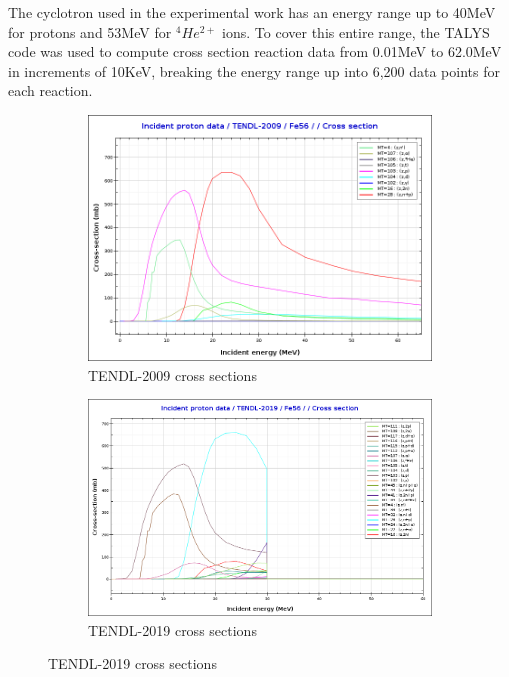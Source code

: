 The cyclotron used in the experimental work has an energy range up to 40MeV for protons and 53MeV for ${}^{4}He^{2+}$ ions.  To cover this entire range, the TALYS code was used to compute cross section reaction data from 0.01MeV to 62.0MeV in increments of 10KeV, breaking the energy range up into 6,200 data points for each reaction.

\begin{figure}[htb]
\centering
\begin{subfigure}{0.49\textwidth}
  \includegraphics[width=\linewidth]{chapters/activity_code/tendl-fe56/tendl_2009_p_fe56.png}
  \caption{TENDL-2009 cross sections}
  \label{fig:xsdata-tendl2009}
\end{subfigure}\hfil %
\begin{subfigure}{0.49\textwidth}
  \includegraphics[width=\linewidth]{chapters/activity_code/tendl-fe56/tendl_2019_p_fe56.png}
  \caption{TENDL-2019 cross sections}
  \label{fig:xsdata-tendl2019}
\end{subfigure}


\end{figure}
